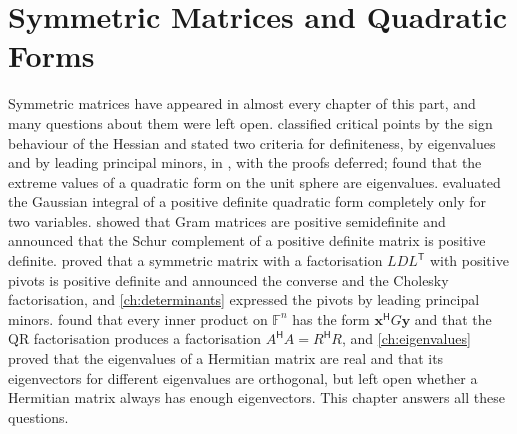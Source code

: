 \chapter{Symmetric Matrices and Quadratic Forms}
\label{ch:symmetric-matrices}


Symmetric matrices have appeared in almost every chapter of this part, and many questions about them were left open.  classified critical points by the sign behaviour of the Hessian and stated two criteria for definiteness, by eigenvalues and by leading principal minors, in , with the proofs deferred;  found that the extreme values of a quadratic form on the unit sphere are eigenvalues.  evaluated the Gaussian integral of a positive definite quadratic form completely only for two variables.  showed that Gram matrices are positive semidefinite and announced that the Schur complement of a positive definite matrix is positive definite.  proved that a symmetric matrix with a factorisation $LDL^{\mathsf T}$ with positive pivots is positive definite and announced the converse and the Cholesky factorisation, and \cref{ch:determinants} expressed the pivots by leading principal minors.  found that every inner product on $\mathbb F^n$ has the form $\mathbf x^{\mathsf H}G\mathbf y$ and that the QR factorisation produces a factorisation $A^{\mathsf H}A=R^{\mathsf H}R$, and \cref{ch:eigenvalues} proved that the eigenvalues of a Hermitian matrix are real and that its eigenvectors for different eigenvalues are orthogonal, but left open whether a Hermitian matrix always has enough eigenvectors. This chapter answers all these questions.

